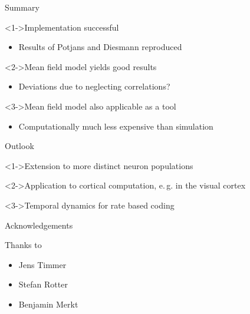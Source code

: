 \documentclass[xcolor=x11names,compress]{beamer}
\renewcommand{\(}{\begin{columns}}
\renewcommand{\)}{\end{columns}}
\newcommand{\<}[1]{\begin{column}{#1}}
\renewcommand{\>}{\end{column}}
\begin{document}
\begin{frame}[t]{Summary}
    \begin{block}<1->{Implementation successful}
        \begin{itemize}
            \item         Results of Potjans and Diesmann reproduced
        \end{itemize}
    \end{block}
    \vfill
    \begin{block}<2->{Mean field model yields good results}
        \begin{itemize}
            \item Deviations due to neglecting correlations?
        \end{itemize}
    \end{block}
    \vfill
    \begin{block}<3->{Mean field model also applicable as a tool}
        \begin{itemize}
            \item         Computationally much less expensive than simulation
        \end{itemize}
    \end{block}
\end{frame}

\begin{frame}[t]{Outlook}
    \begin{block}<1->{Extension to more distinct neuron populations}
    \end{block}
    \vfill
    \begin{block}<2->{Application to cortical computation, e.\,g. in the visual cortex}
    \end{block}
    \vfill
    \begin{block}<3->{Temporal dynamics for rate based coding}
    \end{block}
\end{frame}


\begin{frame}[t]{Acknowledgements}
    \begin{block}{Thanks to}
        \begin{itemize}
            \item Jens Timmer 
            \item Stefan Rotter
            \item Benjamin Merkt 
        \end{itemize}
    \end{block}
\end{frame}
\end{document}

